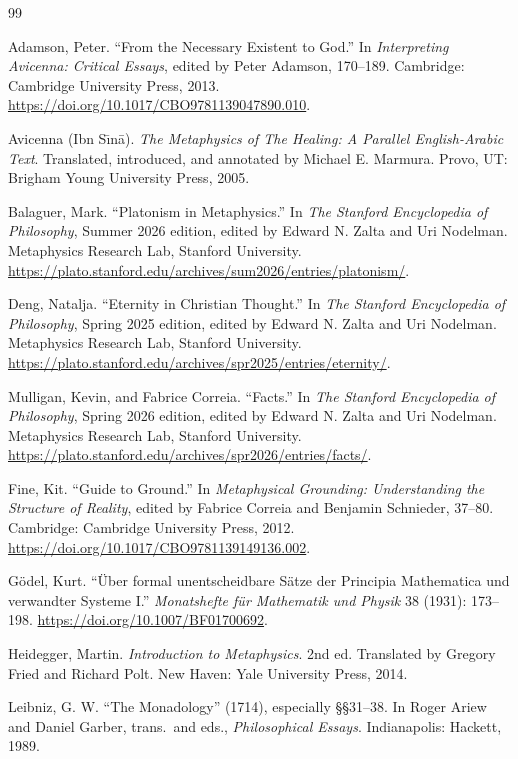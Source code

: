 \documentclass[11pt,letterpaper]{article}
\theoremstyle{plain}
\theoremstyle{definition}
\begin{document}
\clearpage
\begin{thebibliography}{99}

Adamson, Peter. ``From the Necessary Existent to God.'' In \emph{Interpreting Avicenna: Critical Essays}, edited by Peter Adamson, 170--189. Cambridge: Cambridge University Press, 2013. \url{https://doi.org/10.1017/CBO9781139047890.010}.

Avicenna (Ibn S\={\i}n\={a}). \emph{The Metaphysics of The Healing: A Parallel English-Arabic Text}. Translated, introduced, and annotated by Michael E. Marmura. Provo, UT: Brigham Young University Press, 2005.

Balaguer, Mark. ``Platonism in Metaphysics.'' In \emph{The Stanford Encyclopedia of Philosophy}, Summer 2026 edition, edited by Edward N. Zalta and Uri Nodelman. Metaphysics Research Lab, Stanford University. \url{https://plato.stanford.edu/archives/sum2026/entries/platonism/}.

Deng, Natalja. ``Eternity in Christian Thought.'' In \emph{The Stanford Encyclopedia of Philosophy}, Spring 2025 edition, edited by Edward N. Zalta and Uri Nodelman. Metaphysics Research Lab, Stanford University. \url{https://plato.stanford.edu/archives/spr2025/entries/eternity/}.

Mulligan, Kevin, and Fabrice Correia. ``Facts.'' In \emph{The Stanford Encyclopedia of Philosophy}, Spring 2026 edition, edited by Edward N. Zalta and Uri Nodelman. Metaphysics Research Lab, Stanford University. \url{https://plato.stanford.edu/archives/spr2026/entries/facts/}.

Fine, Kit. ``Guide to Ground.'' In \emph{Metaphysical Grounding: Understanding the Structure of Reality}, edited by Fabrice Correia and Benjamin Schnieder, 37--80. Cambridge: Cambridge University Press, 2012. \url{https://doi.org/10.1017/CBO9781139149136.002}.

Gödel, Kurt. ``Über formal unentscheidbare Sätze der Principia Mathematica und verwandter Systeme I.'' \emph{Monatshefte für Mathematik und Physik} 38 (1931): 173--198. \url{https://doi.org/10.1007/BF01700692}.

Heidegger, Martin. \emph{Introduction to Metaphysics}. 2nd ed. Translated by Gregory Fried and Richard Polt. New Haven: Yale University Press, 2014.

Leibniz, G. W. ``The Monadology'' (1714), especially \S\S31--38. In Roger Ariew and Daniel Garber, trans.\ and eds., \emph{Philosophical Essays}. Indianapolis: Hackett, 1989.


\end{thebibliography}
\end{document}
